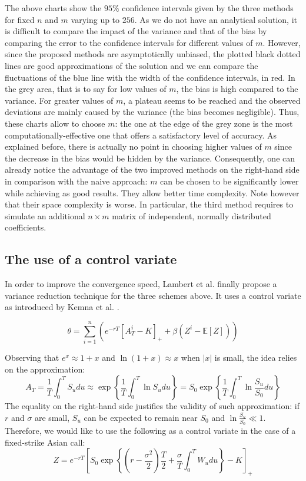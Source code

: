 \documentclass{article}
\begin{document}
The above charts show the $95\%$ confidence intervals given by the three methods for fixed $n$ and $m$
varying up to $256$. As we do not have an analytical solution, it is difficult to compare the impact of the variance and that
of the bias by comparing the error to the confidence intervals for different values of $m$. However, since the proposed
methods are asymptotically unbiased, the plotted black dotted lines are good approximations of the solution and we
can compare the fluctuations of the blue line with the width of the confidence intervals, in red. In the grey area,
that is to say for low values of $m$, the bias is high compared to the variance. For greater values of $m$, a plateau
seems to be reached and the observed deviations are mainly caused by the variance (the bias becomes negligible).
Thus, these charts allow
to choose $m$: the one at the edge of the grey zone is the most computationally-effective one that offers a satisfactory
level of accuracy. As explained before, there is actually no point in choosing higher values of $m$ since the decrease in
the bias would be hidden by the variance. Consequently, one can already notice the advantage of the two improved
methods on the right-hand side in comparison with the naive approach: $m$ can be chosen to be significantly lower
while achieving as good results. They allow better time complexity. Note however that their space complexity is worse.
In particular, the third method requires to simulate an additional $n \times m$ matrix of independent, normally
distributed coefficients.

\subsection{The use of a control variate}

In order to improve the convergence speed, Lambert et al. \cite{main} finally propose a variance reduction technique
for the three schemes above. It uses a control variate as introduced by Kemna et al. \cite{Vorst}.

\begin{equation}
	\theta = \sum_{i=1}^n \left( e^{-rT} \left[ A_T^i - K \right]_+ + \beta \left( Z^i - \mathbb E [Z] \right) \right)
	\tag{$\ast$}
\end{equation}

Observing that $e^x \approx 1 + x$ and $\ln(1 + x) \approx x$ when $| x |$ is small,
the idea relies on the approximation:
\[
	A_T = \frac{1}{T} \int_0^T S_u du \approx \exp \left\{ \frac{1}{T} \int_0^T \ln S_u du \right\}
	= S_0 \exp \left\{ \frac{1}{T} \int_0^T \ln \frac{S_u}{S_0} du \right\}
\]
The equality on the right-hand side justifies the validity of such approximation: if $r$ and $\sigma$ are small,
$S_u$ can be expected to remain near $S_0$ and $\ln \frac{S_u}{S_0} \ll 1$.
Therefore, we would like to use the following as a control variate in the case of a fixed-strike Asian call:
\[
	Z
	= e^{-rT} \left[ S_0 \exp \left\{ \left( r - \frac{\sigma^2}{2} \right) \frac{T}{2} +
		\frac{\sigma}{T} \int_0^T W_u du \right\}
		- K \right]_+
\]
\end{document}
